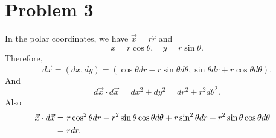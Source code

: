 \documentclass{article}
\begin{document}
\section*{Problem 3}
In the polar coordinates, we have $\vec x = r \hat r$ and
\begin{equation}
x = r \cos \theta, \quad y = r \sin \theta.
\end{equation}
Therefore,
\begin{equation}
    d \vec x = (dx, dy)
    = (\cos \theta dr - r\sin \theta d\theta,
    \sin \theta dr + r \cos \theta d\theta).
\end{equation}
And 
\begin{equation}
    d\vec x \cdot d \vec x = dx^2 + dy^2 = dr^2 + r^2 d \theta^2.
\end{equation}
Also
\begin{align}
   \vec x \cdot d \vec x =&~ r \cos^2 \theta dr 
   - r^2 \sin \theta \cos \theta d\theta
   + r \sin^2 \theta dr 
   + r^2 \sin \theta \cos \theta d\theta\cr
    =& ~r dr.
\end{align}
\end{document}

